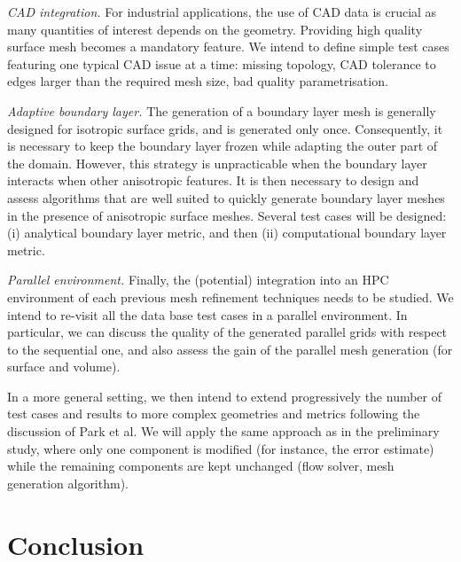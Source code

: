 \documentclass[3p,times,procedia,number]{elsarticle}
\begin{document}
\emph{CAD integration.\;}
For industrial applications, the use of CAD data is crucial as many quantities of interest
depends on the geometry. Providing high quality surface mesh becomes a mandatory feature.
We intend to define simple test cases featuring one typical CAD issue at a time: missing topology,  CAD tolerance to edges larger than the required mesh size,
bad quality parametrisation.

\emph{Adaptive boundary layer.\;}
The generation of a boundary layer mesh is generally designed for isotropic surface grids,
and is generated only once.\cite{pirzadeh-advancing-layer,loseille-lohner-imr21-robust-bl-gen}
Consequently, it is necessary to keep the boundary layer frozen while adapting
the outer part of the domain.\cite{park-carlson-turbulent-output-adapt-aiaa}
However, this strategy is unpracticable when the boundary layer
interacts when other anisotropic features.
It is then necessary to design and assess algorithms that are well suited to quickly generate boundary layer meshes
in the presence of anisotropic surface meshes. Several test cases will be designed:
(i) analytical boundary layer metric, and then (ii) computational boundary layer metric. 

\emph{Parallel environment.\;}
Finally, the (potential) integration into an HPC environment\cite{jansson-hoffman-jansson-siamjsc-2012-para-adapt-fe-cfd} of each previous mesh refinement techniques needs to be studied.
We intend to re-visit all the data base test cases in a parallel environment.
In particular,
we can discuss the quality of the generated parallel grids with respect to the sequential one,
and also assess the gain of the parallel mesh generation (for surface and volume).

In a more general setting, we then intend to extend progressively the number of test cases and results to more complex geometries and metrics
following the discussion of Park et al.\cite{park-unstruct-adapt-status-cfd2030}
We will apply the same approach as in the preliminary study,\cite{park-loseille-krakos-michal-adapt-decomposition}
where only one component is modified (for instance, the error estimate) while the remaining
components are kept unchanged (flow solver, mesh generation algorithm).

\section{Conclusion}
\end{document}

